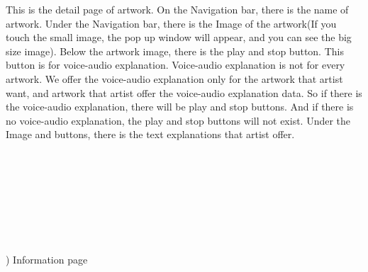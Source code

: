 \documentclass[conference]{IEEEtran}
\begin{document}
This is the detail page of artwork. On the Navigation bar, there is the name of artwork. Under the Navigation bar, there is the Image of the artwork(If you touch the small image, the pop up window will appear, and you can see the big size image). Below the artwork image, there is the play and stop button. This button is for voice-audio explanation. Voice-audio explanation is not for every artwork. We offer the voice-audio explanation only for the artwork that artist want, and artwork that artist offer the voice-audio explanation data. So if there is the voice-audio explanation, there will be play and stop buttons. And if there is no voice-audio explanation, the play and stop buttons will not exist. Under the Image and buttons, there is the text explanations that artist offer. \\\\\\\\\\\\\\\\\\
) Information page\\
\end{document}
